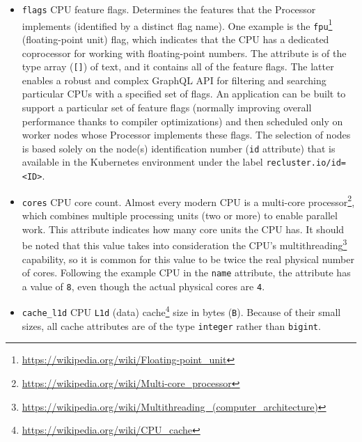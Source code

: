 \begin{itemize}
  \item \texttt{flags}
    \newline
    CPU feature flags.
    \newline
    Determines the features that the Processor implements (identified by a
    distinct flag name). One example is the \texttt{fpu}\footnote{\url{https://wikipedia.org/wiki/Floating-point_unit}}
    (floating-point unit) flag, which indicates that the CPU has a dedicated
    coprocessor for working with floating-point numbers.
    \newline
    The attribute is of the type array (\texttt{[]}) of text, and it contains
    all of the feature flags. The latter enables a robust and complex GraphQL API
    for filtering and searching particular CPUs with a specified set of flags.
    \newline
    An application can be built to support a particular set of feature flags (normally
    improving overall performance thanks to compiler optimizations) and then
    scheduled only on worker nodes whose Processor implements these flags. The selection
    of nodes is based solely on the node(s) identification number (\texttt{id}
    attribute) that is available in the Kubernetes environment under the label \texttt{recluster.io/id=<ID>}.

  \item \texttt{cores}
    \newline
    CPU core count.
    \newline
    Almost every modern CPU is a multi-core processor\footnote{\url{https://wikipedia.org/wiki/Multi-core_processor}},
    which combines multiple processing units (two or more) to enable parallel
    work. This attribute indicates how many core units the CPU has.
    \newline
    It should be noted that this value takes into consideration the CPU's
    multithreading\footnote{\url{https://wikipedia.org/wiki/Multithreading_(computer_architecture)}}
    capability, so it is common for this value to be twice the real physical number
    of cores.
    \newline
    Following the example CPU in the \texttt{name} attribute, the attribute has
    a value of \texttt{8}, even though the actual physical cores are \texttt{4}.

  \item \texttt{cache\_l1d}
    \newline
    CPU \texttt{L1d} (data) cache\footnote{\url{https://wikipedia.org/wiki/CPU_cache}}
    size in bytes (\texttt{B}).
    \newline
    Because of their small sizes, all cache attributes are of the type \texttt{integer}
    rather than \texttt{bigint}.


\end{itemize}
